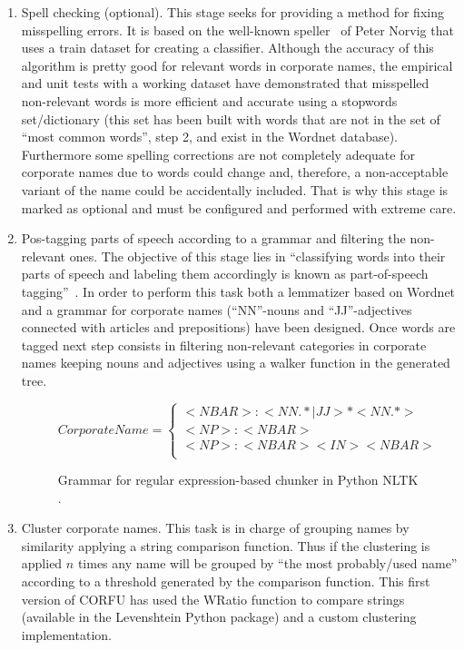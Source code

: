\documentclass{llncs}
\begin{document}
\begin{enumerate}
\item Spell checking (optional). This stage seeks for providing a method for fixing misspelling errors. It is based on the 
well-known speller~\cite{NorvigSpelling} of Peter Norvig that uses a train dataset for creating a classifier. Although the accuracy of this 
algorithm is pretty good for relevant words in corporate names, the empirical and unit tests with a working dataset 
have demonstrated that misspelled non-relevant words is more efficient and accurate using a stopwords set/dictionary (this set has been 
built with words that are not in the set of ``most common words'', step 2, and exist in the Wordnet database). Furthermore some spelling corrections 
are not completely adequate for corporate names due to words could change and, therefore, a non-acceptable variant of the name 
could be accidentally included. That is why this stage is marked as optional and must be configured and performed with extreme care.

\item Pos-tagging parts of speech according to a grammar and filtering the non-relevant ones. The objective 
of this stage lies in ``classifying words into their parts of speech and labeling them accordingly is known as part-of-speech tagging''~\cite{LoperBird02}. In order 
to perform this task both a lemmatizer based on Wordnet and a grammar for corporate names (``NN''-nouns and ``JJ''-adjectives connected with articles and 
prepositions) have been designed. Once words are tagged next step consists in filtering non-relevant categories 
in corporate names keeping nouns and adjectives using a walker function in the generated tree.
\begin{figure}[ht]
\begin{center}
\[
Corporate Name=
\begin{cases}
<NBAR>:<NN.*|JJ>* <NN.*> \\
<NP>  :{<NBAR>} \\
<NP>  :{<NBAR><IN><NBAR>} \\
\end{cases}
\]
\end{center}
\caption{Grammar for regular expression-based chunker in Python NLTK .}
\label{figure:step-4}
\end{figure}


\item Cluster corporate names. This task is in charge of grouping names by similarity applying 
a string comparison function. Thus if the clustering is applied $n$ times any name 
will be grouped by ``the most probably/used name'' according to a threshold generated 
by the comparison function. This first version of CORFU has used the WRatio function to 
compare strings (available in the Levenshtein Python package) and a custom clustering 
implementation.


\end{enumerate}
\end{document}
